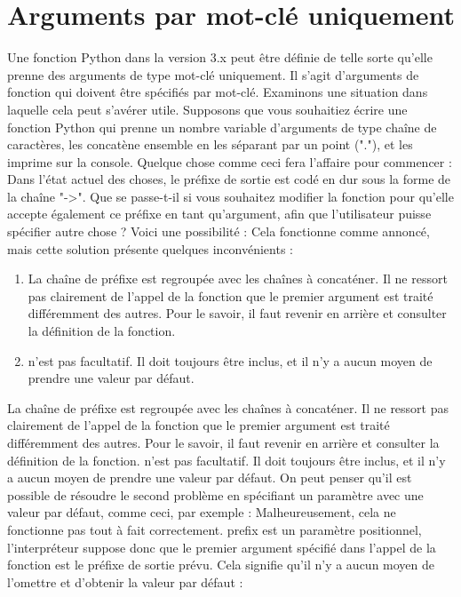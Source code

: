 \section{Arguments par mot-clé uniquement}
Une fonction Python dans la version 3.x peut être définie de telle sorte qu'elle prenne des arguments de type mot-clé uniquement.  Il s'agit d'arguments de fonction qui doivent être spécifiés par mot-clé.  Examinons une situation dans laquelle cela peut s'avérer utile.
Supposons que vous souhaitiez écrire une fonction Python qui prenne un nombre variable d'arguments de type chaîne de caractères, les concatène ensemble en les séparant par un point ("."), et les imprime sur la console.  Quelque chose comme ceci fera l'affaire pour commencer :
Dans l'état actuel des choses, le préfixe de sortie est codé en dur sous la forme de la chaîne "->".  Que se passe-t-il si vous souhaitez modifier la fonction pour qu'elle accepte également ce préfixe en tant qu'argument, afin que l'utilisateur puisse spécifier autre chose ?  Voici une possibilité :
Cela fonctionne comme annoncé, mais cette solution présente quelques inconvénients :
\begin{enumerate}
\item 
La chaîne de préfixe est regroupée avec les chaînes à concaténer.  Il ne ressort pas clairement de l'appel de la fonction que le premier argument est traité différemment des autres.  Pour le savoir, il faut revenir en arrière et consulter la définition de la fonction.

\item 
n'est pas facultatif.  Il doit toujours être inclus, et il n'y a aucun moyen de prendre une valeur par défaut.

\end{enumerate}
La chaîne de préfixe est regroupée avec les chaînes à concaténer.  Il ne ressort pas clairement de l'appel de la fonction que le premier argument est traité différemment des autres.  Pour le savoir, il faut revenir en arrière et consulter la définition de la fonction.
n'est pas facultatif.  Il doit toujours être inclus, et il n'y a aucun moyen de prendre une valeur par défaut.
On peut penser qu'il est possible de résoudre le second problème en spécifiant un paramètre avec une valeur par défaut, comme ceci, par exemple :
Malheureusement, cela ne fonctionne pas tout à fait correctement. prefix est un paramètre positionnel, l'interpréteur suppose donc que le premier argument spécifié dans l'appel de la fonction est le préfixe de sortie prévu.  Cela signifie qu'il n'y a aucun moyen de l'omettre et d'obtenir la valeur par défaut :
